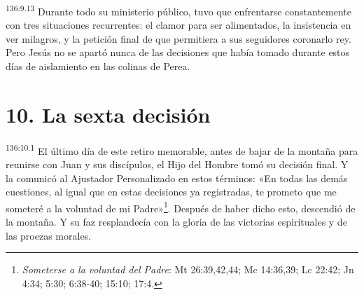 \par
\textsuperscript{136:9.13} Durante todo su ministerio público, tuvo que enfrentarse constantemente con tres situaciones recurrentes: el clamor para ser alimentados, la insistencia en ver milagros, y la petición final de que permitiera a sus seguidores coronarlo rey. Pero Jesús no se apartó nunca de las decisiones que había tomado durante estos días de aislamiento en las colinas de Perea.

\section*{10. La sexta decisión}
\par
\textsuperscript{136:10.1} El último día de este retiro memorable, antes de bajar de la montaña para reunirse con Juan y sus discípulos, el Hijo del Hombre tomó su decisión final. Y la comunicó al Ajustador Personalizado en estos términos: «En todas las demás cuestiones, al igual que en estas decisiones ya registradas, te prometo que me someteré a la voluntad de mi Padre»\footnote{\textit{Someterse a la voluntad del Padre}: Mt 26:39,42,44; Mc 14:36,39; Lc 22:42; Jn 4:34; 5:30; 6:38-40; 15:10; 17:4.}. Después de haber dicho esto, descendió de la montaña. Y su faz resplandecía con la gloria de las victorias espirituales y de las proezas morales.